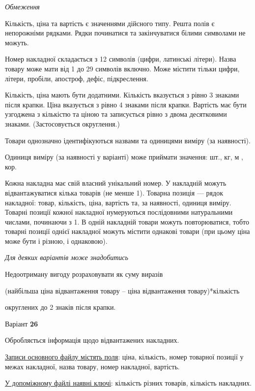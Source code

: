 \documentclass[11pt, ukrainian]{article}
\begin{document}

\bigskip\textit{Обмеження}

Кількість, ціна та вартість є значеннями дійсного типу.
Решта полів є непорожніми рядками.
Рядки починатися та закінчуватися білими символами не можуть.

Номер накладної складається з 12 символів (цифри, латинські літери).
Назва товару може мати від 1 до 29 символів включно.
Може містити тільки цифри, літери, пробіли, апостроф, дефіс, підкреслення.

Кількість, ціна мають бути додатними.
Кількість вказується з рівно 3 знаками після крапки.
Ціна вказується з рівно 4 знаками після крапки.
Вартість має бути узгоджена з кількістю та ціною та записується рівно з двома десятковими знаками.
(Застосовується округлення.)

Товари однозначно ідентифікуються назвами та одиницями виміру (за наявності).

Одиниця виміру (за наявності у варіанті) може приймати значення: шт., кг, м , кор.

Кожна накладна має свій власний унікальний номер.
У накладній можуть відвантажуватися кілька товарів (не менше 1).
Товарна позиція --- рядок накладної: товар, кількість, ціна, вартість та, за наявності, одиниця виміру.
Товарні позиції кожної накладної нумеруються послідовними натуральними числами, починаючи з 1.
В одній накладній товари можуть повторюватися, 
тобто товарні позиції однієї накладної можуть містити однакові товари 
(при цьому ціна може бути і різною, і однаковою).

\bigskip\textit{Для деяких варіантів може знадобитись}

Недоотриману вигоду розраховувати як суму виразів
{\center (найбільша ціна відвантаження товару – ціна відвантаження товару)*кількість\par}

\bigskip
{\noindent} округлених до 2 знаків після крапки.


\par
\newpage
{\center Варіант  \No \textbf { 26 }\par}
\bigskip
Обробляється інформація щодо відвантажених накладних.

\underline{Записи основного файлу містять поля}: ціна, кількість, номер товарної позиції у межах накладної, назва товару, номер накладної, вартість.

\underline{У допоміжному файлі наявні ключі}: кількість різних товарів, кількість накладних.
\end{document}
